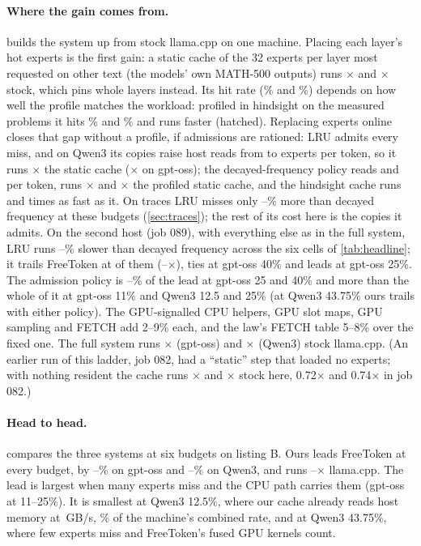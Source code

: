 \documentclass[10pt,twocolumn]{article}
\begin{document}
\paragraph{Where the gain comes from.}  builds the system up from stock llama.cpp on one machine.
Placing each layer's hot experts is the first gain: a static cache of the 32 experts per layer most
requested on other text (the models' own MATH-500 outputs) runs \ablStaticGpt$\times$ and \ablStaticQwen$\times$ stock,
which pins whole layers instead. Its hit rate (\ablStaticHitGpt\% and \ablStaticHitQwen\%) depends on how well the
profile matches the workload: profiled in hindsight on the measured problems it hits \ablHindHitGpt\% and
\ablHindHitQwen\% and runs faster (hatched). Replacing experts online closes that gap without a profile, if admissions
are rationed: LRU admits every miss, and on Qwen3 its copies raise host reads from \rdStaticQwen{} to \rdLruQwen{}
experts per token, so it runs \ablLruQwen$\times$ the static cache (\ablLruGpt$\times$ on gpt-oss); the
decayed-frequency policy reads \rdDfaGpt{} and \rdDfaQwen{} per token, runs \ablDfaStaticGpt$\times$ and
\ablDfaStaticQwen$\times$ the profiled static cache, and the hindsight cache runs \ablHindGpt{} and \ablHindQwen{} times
as fast as it. On traces LRU misses only \polLruMoreMin--\polLruMoreMax\% more than decayed frequency at these budgets
(\cref{sec:traces}); the rest of its cost here is the copies it admits. On the second host (job 089), with everything
else as in the full system, LRU runs \scLruSlowMin--\scLruSlowMax\% slower than decayed frequency across the six
cells of \cref{tab:headline}; it trails FreeToken at \scLruTrailCells{} of them
(\scLruTrailMin--\scLruTrailMax$\times$), ties at gpt-oss 40\% and leads at gpt-oss 25\%. The admission policy is
\scPolicyShareGptMin--\scPolicyShareGptMax\% of the lead at gpt-oss 25 and 40\% and more than the whole of it at
gpt-oss 11\% and Qwen3 12.5 and 25\% (at Qwen3 43.75\% ours trails with either policy). The GPU-signalled CPU helpers, GPU slot maps, GPU
sampling and FETCH add 2--9\% each, and the law's FETCH table 5--8\% over the fixed one. The full system runs
\ablGptX$\times$ (gpt-oss) and \ablQwenX$\times$ (Qwen3) stock llama.cpp. (An earlier run of this ladder, job 082, had a
``static'' step that loaded no experts; with nothing resident the cache runs \ablNoneGpt$\times$ and
\ablNoneQwen$\times$ stock here, 0.72$\times$ and 0.74$\times$ in job 082.)

\paragraph{Head to head.}  compares the three systems at six budgets on listing B. Ours leads
FreeToken at every budget, by \ftLeadGptMin--\ftLeadGptMax\% on gpt-oss and \ftLeadQwenMin--\ftLeadQwenMax\% on Qwen3,
and runs \llamaXMin--\llamaXMax$\times$ llama.cpp. The lead is largest when many experts miss and the CPU path carries
them (gpt-oss at 11--25\%). It is smallest at Qwen3 12.5\%, where our cache already reads host memory at \qlowBW\,GB/s,
\qlowBWpct\% of the machine's combined rate, and at Qwen3 43.75\%, where few experts miss and FreeToken's fused GPU
kernels count.
\end{document}
